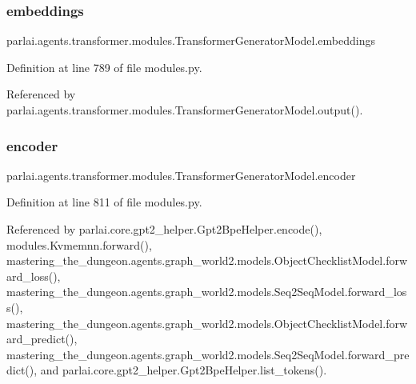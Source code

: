 \mbox{\label{classparlai_1_1agents_1_1transformer_1_1modules_1_1TransformerGeneratorModel_a18411754103e8c8f4cd2e9338351b98d}} 
\subsubsection{\texorpdfstring{embeddings}{embeddings}}
{\footnotesize\ttfamily parlai.\+agents.\+transformer.\+modules.\+Transformer\+Generator\+Model.\+embeddings}



Definition at line 789 of file modules.\+py.



Referenced by parlai.\+agents.\+transformer.\+modules.\+Transformer\+Generator\+Model.\+output().

\mbox{\label{classparlai_1_1agents_1_1transformer_1_1modules_1_1TransformerGeneratorModel_af165b8ec1505f768c530aea02d68ae09}} 
\subsubsection{\texorpdfstring{encoder}{encoder}}
{\footnotesize\ttfamily parlai.\+agents.\+transformer.\+modules.\+Transformer\+Generator\+Model.\+encoder}



Definition at line 811 of file modules.\+py.



Referenced by parlai.\+core.\+gpt2\+\_\+helper.\+Gpt2\+Bpe\+Helper.\+encode(), modules.\+Kvmemnn.\+forward(), mastering\+\_\+the\+\_\+dungeon.\+agents.\+graph\+\_\+world2.\+models.\+Object\+Checklist\+Model.\+forward\+\_\+loss(), mastering\+\_\+the\+\_\+dungeon.\+agents.\+graph\+\_\+world2.\+models.\+Seq2\+Seq\+Model.\+forward\+\_\+loss(), mastering\+\_\+the\+\_\+dungeon.\+agents.\+graph\+\_\+world2.\+models.\+Object\+Checklist\+Model.\+forward\+\_\+predict(), mastering\+\_\+the\+\_\+dungeon.\+agents.\+graph\+\_\+world2.\+models.\+Seq2\+Seq\+Model.\+forward\+\_\+predict(), and parlai.\+core.\+gpt2\+\_\+helper.\+Gpt2\+Bpe\+Helper.\+list\+\_\+tokens().

